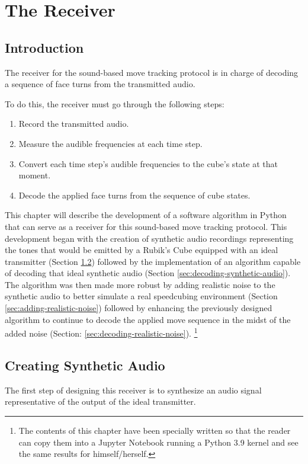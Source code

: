
\chapter{The Receiver} %

\label{Chapter5}

\section{Introduction}
The receiver for the sound-based move tracking protocol is in charge of decoding a sequence of face turns from the transmitted audio.

To do this, the receiver must go through the following steps:
\begin{enumerate}
    \item Record the transmitted audio.
    \item Measure the audible frequencies at each time step.
    \item Convert each time step's audible frequencies to the cube's state at that moment.
    \item Decode the applied face turns from the sequence of cube states.
\end{enumerate}

This chapter will describe the development of a software algorithm in Python that can serve as a receiver for this sound-based move tracking protocol. 
This development began with the creation of synthetic audio recordings representing the tones that would be emitted by a Rubik's Cube equipped with an ideal transmitter (Section \ref{sec:synthetic-audio-generation}) followed by the implementation of an algorithm capable of decoding that ideal synthetic audio (Section \ref{sec:decoding-synthetic-audio}).
The algorithm was then made more robust by adding realistic noise to the synthetic audio to better simulate a real speedcubing environment (Section \ref{sec:adding-realistic-noise}) followed by enhancing the previously designed algorithm to continue to decode the applied move sequence in the midst of the added noise (Section: \ref{sec:decoding-realistic-noise}). \footnote{The contents of this chapter have been specially written so that the reader can copy them into a Jupyter Notebook running a Python 3.9 kernel and see the same results for himself/herself.} 


\section{Creating Synthetic Audio}
\label{sec:synthetic-audio-generation}
The first step of designing this receiver is to synthesize an audio signal representative of the output of the ideal transmitter.

